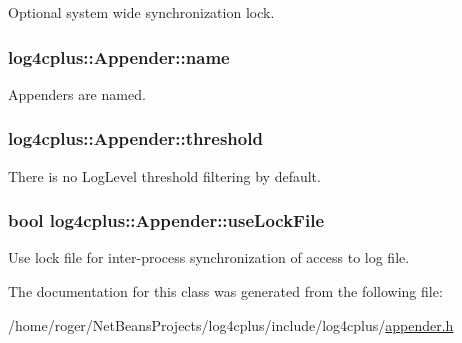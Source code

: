 Optional system wide synchronization lock. 

\hypertarget{classlog4cplus_1_1Appender_a7396e57f462275efb5c4050ef76230b2}{
\subsubsection[{name}]{ log4cplus\-::\-Appender\-::name\hspace{0.3cm}{\ttfamily [protected]}}}\label{classlog4cplus_1_1Appender_a7396e57f462275efb5c4050ef76230b2}
Appenders are named. \hypertarget{classlog4cplus_1_1Appender_ac5c52f4dd571d2347a8ec7fc9aa7cedd}{
\subsubsection[{threshold}]{ log4cplus\-::\-Appender\-::threshold\hspace{0.3cm}{\ttfamily [protected]}}}\label{classlog4cplus_1_1Appender_ac5c52f4dd571d2347a8ec7fc9aa7cedd}
There is no Log\-Level threshold filtering by default. \hypertarget{classlog4cplus_1_1Appender_a448f8d2e3bf631b1c557e1da8f58fbbb}{
\subsubsection[{use\-Lock\-File}]{\setlength{\rightskip}{0pt plus 5cm}bool log4cplus\-::\-Appender\-::use\-Lock\-File\hspace{0.3cm}{\ttfamily [protected]}}}\label{classlog4cplus_1_1Appender_a448f8d2e3bf631b1c557e1da8f58fbbb}
Use lock file for inter-\/process synchronization of access to log file. 

The documentation for this class was generated from the following file\-:\begin{DoxyCompactItemize}
\item 
/home/roger/\-Net\-Beans\-Projects/log4cplus/include/log4cplus/\hyperlink{appender_8h}{appender.\-h}\end{DoxyCompactItemize}

